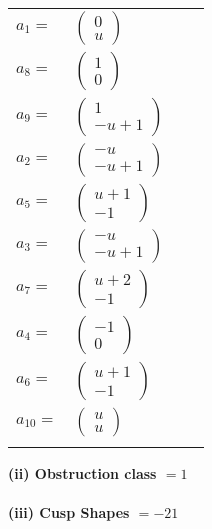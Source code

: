 \documentclass[1p]{elsarticle_modified}
\theoremstyle{definition}
\begin{document}
\begin{tabular}{m{7pt} m{180pt} m{7pt} m{180pt} }
\flushright $a_{1}=$&$\begin{pmatrix}0\\u\end{pmatrix}$ \\
\flushright $a_{8}=$&$\begin{pmatrix}1\\0\end{pmatrix}$ \\
\flushright $a_{9}=$&$\begin{pmatrix}1\\- u+1\end{pmatrix}$ \\
\flushright $a_{2}=$&$\begin{pmatrix}- u\\- u+1\end{pmatrix}$ \\
\flushright $a_{5}=$&$\begin{pmatrix}u+1\\-1\end{pmatrix}$ \\
\flushright $a_{3}=$&$\begin{pmatrix}- u\\- u+1\end{pmatrix}$ \\
\flushright $a_{7}=$&$\begin{pmatrix}u+2\\-1\end{pmatrix}$ \\
\flushright $a_{4}=$&$\begin{pmatrix}-1\\0\end{pmatrix}$ \\
\flushright $a_{6}=$&$\begin{pmatrix}u+1\\-1\end{pmatrix}$ \\
\flushright $a_{10}=$&$\begin{pmatrix}u\\u\end{pmatrix}$\\&\end{tabular}
\flushleft \textbf{(ii) Obstruction class $= 1$}\\~\\
\flushleft \textbf{(iii) Cusp Shapes $= -21$}\\~\\
\end{document}
